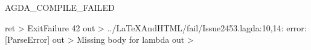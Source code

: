 AGDA_COMPILE_FAILED

ret > ExitFailure 42 out > ../LaTeXAndHTML/fail/Issue2453.lagda:10,14: error: [ParseError] out > Missing body for lambda out >